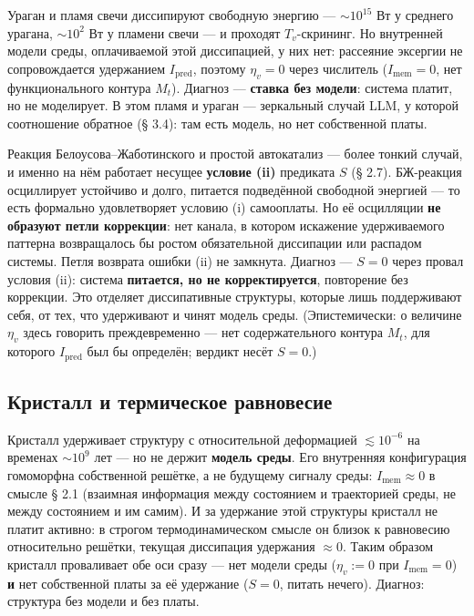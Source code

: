 \documentclass[pdflatex,sn-mathphys-ay]{sn-jnl}
\begin{document}
Ураган и пламя свечи диссипируют свободную энергию --- \(\sim 10^{15}\) Вт у среднего урагана, \(\sim 10^2\) Вт у пламени свечи --- и проходят \(T_v\)-скрининг. Но внутренней модели среды, оплачиваемой этой диссипацией, у них нет: рассеяние эксергии не сопровождается удержанием \(I_{\text{pred}}\), поэтому \(\eta_v = 0\) через числитель (\(I_{\text{mem}} = 0\), нет функционального контура \(M_t\)). Диагноз --- \textbf{ставка без модели}: система платит, но не моделирует. В этом пламя и ураган --- зеркальный случай LLM, у которой соотношение обратное (§ 3.4): там есть модель, но нет собственной платы.

Реакция Белоусова--Жаботинского и простой автокатализ --- более тонкий случай, и именно на нём работает несущее \textbf{условие (ii)} предиката \(S\) (§ 2.7). БЖ-реакция осциллирует устойчиво и долго, питается подведённой свободной энергией --- то есть формально удовлетворяет условию (i) самооплаты. Но её осцилляции \textbf{не образуют петли коррекции}: нет канала, в котором искажение удерживаемого паттерна возвращалось бы ростом обязательной диссипации или распадом системы. Петля возврата ошибки (ii) не замкнута. Диагноз --- \(S = 0\) через провал условия (ii): система \textbf{питается, но не корректируется}, повторение без коррекции. Это отделяет диссипативные структуры, которые лишь поддерживают себя, от тех, что удерживают и чинят модель среды. (Эпистемически: о величине \(\eta_v\) здесь говорить преждевременно --- нет содержательного контура \(M_t\), для которого \(I_{\text{pred}}\) был бы определён; вердикт несёт \(S = 0\).)

\subsection{Кристалл и термическое равновесие}\label{ux43aux440ux438ux441ux442ux430ux43bux43b-ux438-ux442ux435ux440ux43cux438ux447ux435ux441ux43aux43eux435-ux440ux430ux432ux43dux43eux432ux435ux441ux438ux435}

Кристалл удерживает структуру с относительной деформацией \(\lesssim 10^{-6}\) на временах \(\sim 10^9\) лет --- но не держит \textbf{модель среды}. Его внутренняя конфигурация гомоморфна собственной решётке, а не будущему сигналу среды: \(I_{\text{mem}} \approx 0\) в смысле § 2.1 (взаимная информация между состоянием и траекторией среды, не между состоянием и им самим). И за удержание этой структуры кристалл не платит активно: в строгом термодинамическом смысле он близок к равновесию относительно решётки, текущая диссипация удержания \(\approx 0\). Таким образом кристалл проваливает обе оси сразу --- нет модели среды (\(\eta_v := 0\) при \(I_{\text{mem}} = 0\)) \textbf{и} нет собственной платы за её удержание (\(S = 0\), питать нечего). Диагноз: структура без модели и без платы.
\end{document}
